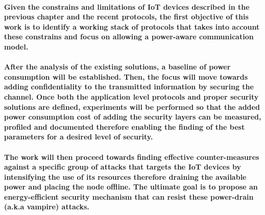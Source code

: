 \paragraph{
Given the constrains and limitations of \ac{IoT} devices described in the previous chapter and the recent protocols, the first objective of this work is to identify a working stack of protocols that takes into account these constrains and focus on allowing a power-aware communication model.
}

\paragraph{
After the analysis of the existing solutions, a baseline of power consumption will be established. Then, the focus will move towards adding confidentiality to the transmitted information by securing the channel.
Once both the application level protocols and proper security solutions are defined, experiments will be performed so that the added power consumption cost of adding the security layers can be measured, profiled and documented therefore enabling the finding of the best parameters for a desired level of security.
}

\paragraph{
The work will then proceed towards finding effective counter-measures against a specific group of attacks that targets the \ac{IoT} devices by intensifying the use of its resources therefore draining the available power and placing the node offline.
The ultimate goal is to propose an energy-efficient security mechanism that can resist these power-drain (a.k.a vampire) attacks.
}